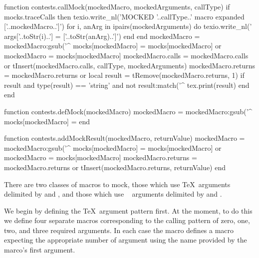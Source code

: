 function contests.callMock(mockedMacro, mockedArguments, callType)
  if mocks.traceCalls then
    texio.write_nl('MOCKED '..callType..' macro expanded ['..mockedMacro..']')
    for i, anArg in ipairs(mockedArguments) do
      texio.write_nl('  args['..toStr(i)..'] = ['..toStr(anArg)..']')
    end
  end
  mockedMacro = mockedMacro:gsub('^%
  mocks[mockedMacro] = mocks[mockedMacro] or { }
  mockedMacro = mocks[mockedMacro]
  mockedMacro.calls = mockedMacro.calls or { }
  tInsert(mockedMacro.calls, { callType, mockedArguments})
  mockedMacro.returns = mockedMacro.returns or { }
  local result = tRemove(mockedMacro.returns, 1)
  if result and type(result) == 'string' and not result:match('^%
    tex.print(result)
  end
end

function contests.defMock(mockedMacro)
  mockedMacro = mockedMacro:gsub('^%
  mocks[mockedMacro] = { }
end

function contests.addMockResult(mockedMacro, returnValue)
  mockedMacro = mockedMacro:gsub('^%
  mocks[mockedMacro] = mocks[mockedMacro] or { }
  mockedMacro = mocks[mockedMacro]
  mockedMacro.returns = mockedMacro.returns or { }
  tInsert(mockedMacro.returns, returnValue)
end
\stopLuaCode


There are two classes of macros to mock, those which use  
\TeX\ arguments delimited by \quote{\{} and \quote{\}}, and those which 
use \ConTeXt\  arguments delimited by \quote{\[} and 
\quote{\]}. 

We begin by defining the \TeX\ argument pattern first. At the moment, to 
do this we define four separate macros corresponding to the calling 
pattern of zero, one, two, and three required arguments. In each case the 
 macro defines a macro expecting the appropriate 
number of argument using the name provided by the  
marco's first argument. 

\startMkIVCode
\def\callTexMockZero#1{%
  \directlua{%
    thirddata.contests.callMock('#1', { }, 'tex')
  }
}
\def\defTexMockZeroArgs#1{%
  \directlua{thirddata.contests.defMock('#1')}%
  \setevalue{#1}{\noexpand\callTexMockZero{#1}}%
}

\def\callTexMockOne#1#2{%
  \directlua{%
    thirddata.contests.callMock('#1', { '#2' }, 'tex')
  }
}
\def\defTexMockOneArg#1{%
  \directlua{thirddata.contests.defMock('#1')}%
  \setevalue{#1}{\noexpand\callTexMockOne{#1}}%
}

